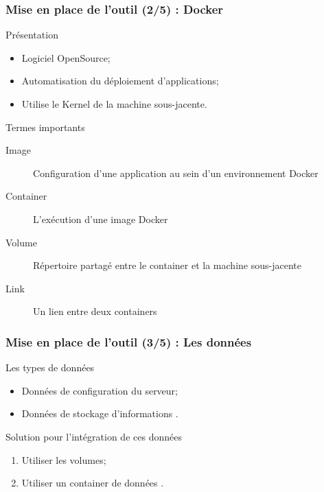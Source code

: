 \begin{frame}
	\frametitle{Mise en place de l'outil (2/5) : Docker}

    \begin{block}{Présentation}
	 \begin{itemize}
	  \item Logiciel OpenSource;
      \item Automatisation du déploiement d’applications;
	  \item Utilise le Kernel de la machine sous-jacente.
	 \end{itemize}
	\end{block}

	\begin{block}{Termes importants}
	 \begin{description}
	  \item [Image] Configuration d’une application au sein d'un environnement Docker
	  \item [Container] L'exécution d'une image Docker
	  \item [Volume] Répertoire partagé entre le container et la machine sous-jacente
	  \item [Link] Un lien entre deux containers
	 \end{description}
	\end{block}

\end{frame}

\begin{frame}
	\frametitle{Mise en place de l'outil (3/5) : Les données}

    \begin{block}{Les types de données}
		\begin{itemize}
			\item Données de configuration du serveur;
			\item Données de stockage d'informations .
		\end{itemize}
	\end{block}

	\begin{block}{Solution pour l'intégration de ces données}
		\begin{enumerate}
			\item Utiliser les volumes;
			\item Utiliser un container de données .
		\end{enumerate}
	\end{block}


\end{frame}

